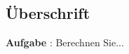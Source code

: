 \documentclass[11pt,a4paper,DIV=12]{scrartcl}
\numberwithin{equation}{section}
\numberwithin{figure}{section}
\begin{document}
\newpage
\subsection{Überschrift}
\label{sec:}
\begin{Ziel}
\end{Ziel}
\textbf{Aufgabe} {\tiny }: Berechnen Sie...
\begin{Werkzeug}
\end{Werkzeug}
\begin{Ansatz}
\end{Ansatz}
\begin{ExCalc}
\end{ExCalc}
\begin{Loesung}
\end{Loesung}



%
\cite{*}
\clearpage

\end{document}
